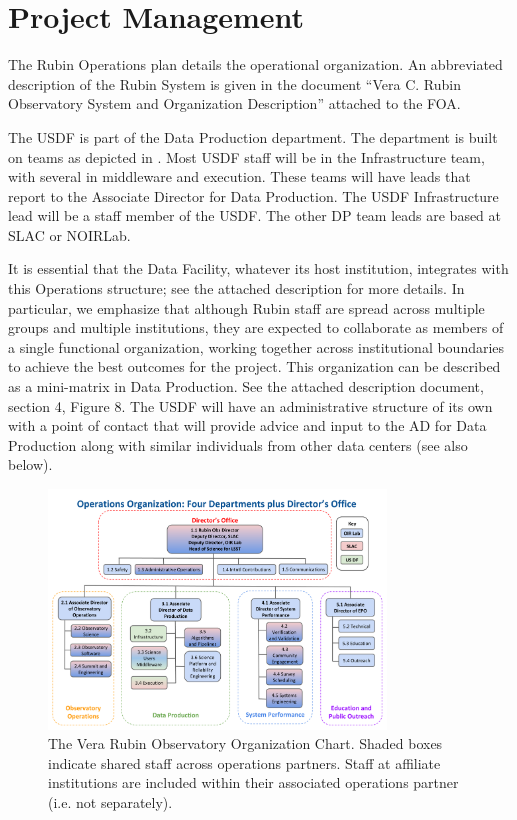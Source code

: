 \section{Project Management}

The Rubin Operations plan details the operational organization. An abbreviated
description of the Rubin System is given in the document
``Vera C. Rubin Observatory System and Organization Description''
attached to the \gls{FOA}.

The \gls{USDF} is part of the Data Production department.
The department is built on teams as
depicted in . Most \gls{USDF} staff will be in the
Infrastructure team, with several in middleware and execution. These teams will have leads that report to the Associate Director for Data Production. The \gls{USDF} Infrastructure lead will be a staff member of the \gls{USDF}. The other DP
team leads are based at SLAC or NOIRLab.

It is essential that the Data Facility, whatever its host institution,
integrates with this Operations structure; see the attached description
for more details.
In particular, we emphasize that although Rubin staff are spread across multiple groups and multiple institutions, they are expected to collaborate as members of a single functional organization, working together across institutional boundaries to achieve the best outcomes for the project. This organization can be
described as a mini-matrix in Data Production. See the attached description document, section 4, Figure 8. The USDF will have an administrative structure of
its own with a point of contact that will provide advice and input to the
AD for Data Production along with similar individuals from other
data centers (see also  below).

\begin{figure}
\begin{center}
\includegraphics[width=0.8\textwidth]{figs/orgchart}
\end{center}
\caption{
The Vera Rubin Observatory Organization Chart. Shaded boxes indicate shared staff across operations partners. Staff at affiliate institutions  are included within their associated operations partner (i.e. not separately).
\label{fig:orgchart}}
\end{figure}

